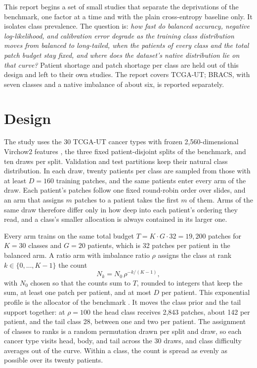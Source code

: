 \documentclass[11pt]{article}
\begin{document}
This report begins a set of small studies that separate the deprivations of the benchmark, one factor at a time and with the plain cross-entropy baseline only. It isolates class prevalence. The question is: \emph{how fast do balanced accuracy, negative log-likelihood, and calibration error degrade as the training class distribution moves from balanced to long-tailed, when the patients of every class and the total patch budget stay fixed, and where does the dataset's native distribution lie on that curve?} Patient shortage and patch shortage per class are held out of this design and left to their own studies. The report covers TCGA-UT; BRACS, with seven classes and a native imbalance of about six, is reported separately.

\section{Design}
\label{sec:design}
The study uses the 30 TCGA-UT cancer types with frozen 2,560-dimensional Virchow2 features \citep{zimmermann2024virchow2}, the three fixed patient-disjoint splits of the benchmark, and ten draws per split. Validation and test partitions keep their natural class distribution. In each draw, twenty patients per class are sampled from those with at least $D=160$ training patches, and the same patients enter every arm of the draw. Each patient's patches follow one fixed round-robin order over slides, and an arm that assigns $m$ patches to a patient takes the first $m$ of them. Arms of the same draw therefore differ only in how deep into each patient's ordering they read, and a class's smaller allocation is always contained in its larger one.

Every arm trains on the same total budget $T=K\cdot G\cdot 32=19{,}200$ patches for $K=30$ classes and $G=20$ patients, which is 32 patches per patient in the balanced arm. A ratio arm with imbalance ratio $\rho$ assigns the class at rank $k\in\{0,\dots,K-1\}$ the count
\begin{equation}
  N_k = N_0\,\rho^{-k/(K-1)},
  \label{eq:profile}
\end{equation}
\noindent with $N_0$ chosen so that the counts sum to $T$, rounded to integers that keep the sum, at least one patch per patient, and at most $D$ per patient. This exponential profile is the allocator of the benchmark \citep{queisler2026benchmarkProtocol}. It moves the class prior and the tail support together: at $\rho=100$ the head class receives 2,843 patches, about 142 per patient, and the tail class 28, between one and two per patient. The assignment of classes to ranks is a random permutation drawn per split and draw, so each cancer type visits head, body, and tail across the 30 draws, and class difficulty averages out of the curve. Within a class, the count is spread as evenly as possible over its twenty patients.
\end{document}
